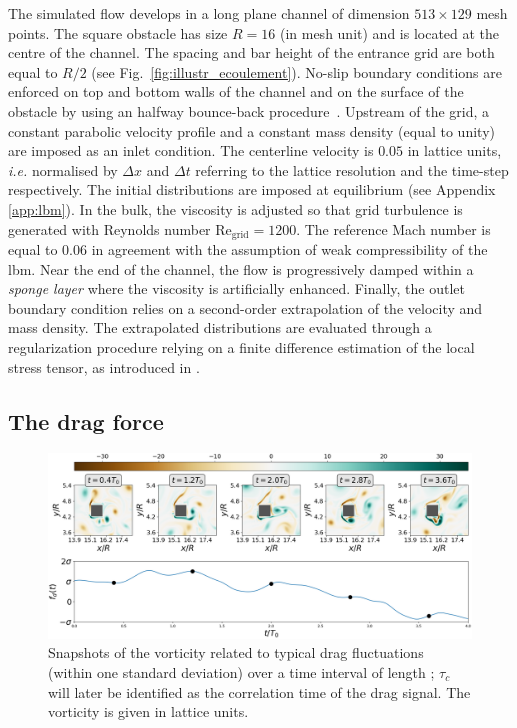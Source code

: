 \documentclass{jfm}
\newcommand{\EL}[1]{{\color{myred}{#1}}}
\begin{document}
%
The simulated flow develops in a long plane channel of dimension $513 \times 129$ mesh points. The square obstacle has size $R=16$ (in mesh unit) and is located at the centre of the channel. The spacing and bar height of the entrance grid are both equal to $R/2$ (see Fig.~\ref{fig:illustr_ecoulement}). 
%
No-slip boundary conditions are enforced on top and bottom walls of the channel and on the surface of the obstacle by using an halfway bounce-back procedure~\citep{lbm_book}.  
%
Upstream of the grid, a constant parabolic velocity profile and a constant mass density (equal to unity) are imposed as an inlet condition. 
The centerline velocity is $0.05$ in lattice units, \textit{i.e.} normalised by $\Delta x$ and $\Delta t$ referring to the lattice resolution and the time-step respectively. The initial distributions are imposed at equilibrium (see Appendix \ref{app:lbm}). 
In the bulk, the viscosity is adjusted so that grid turbulence is generated with Reynolds number $\mathrm{Re_{grid}}=1200$. The reference Mach number is equal to $0.06$ in agreement with the assumption of weak compressibility of the \ac{lbm}. 
Near the end of the channel, the flow is progressively damped within a \textit{sponge layer} where the viscosity is artificially enhanced.
Finally, the outlet boundary condition relies on a second-order extrapolation of the velocity and mass density.
The extrapolated distributions are evaluated through a regularization procedure relying on a finite difference estimation of the local stress tensor, as introduced in \cite{latt2008straight}. 


\subsection{The drag force}
\label{sec:drag_force}

\begin{figure}
	\centering
	\includegraphics[width=\linewidth]{ecoulement_typique/ecoulement_typique.png}
	\caption{Snapshots of the vorticity related to typical drag fluctuations (within one standard deviation) over a time interval of length \EL{$\tau_c \simeq 4T_0$}; $\tau_c$ will later be identified as the correlation time of the drag signal.
		The vorticity is given in lattice units.}
	\label{fig:typical_vorticity}
\end{figure}
\end{document}
